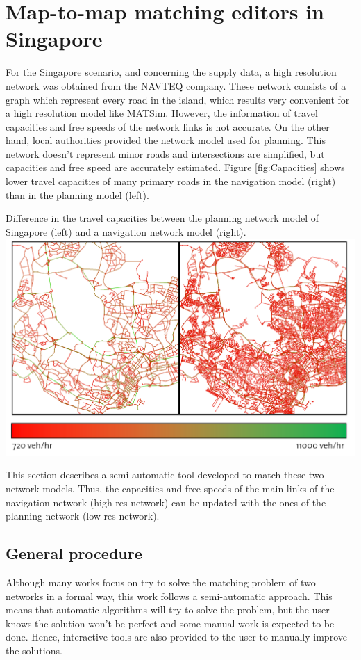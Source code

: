\section{Map-to-map matching editors in Singapore}
\citet[][]{Ordonez_Webpage_2011_3}
For the Singapore scenario, and concerning the supply data, a high resolution network was obtained from the NAVTEQ company. These network consists of a graph which represent every road in the island, which results very convenient for a high resolution model like MATSim. However, the information of travel capacities and free speeds of the network links is not accurate. On the other hand, local authorities provided the network model used for planning. This network doesn't represent minor roads and intersections are simplified, but capacities and free speed are accurately estimated. Figure \ref{fig:Capacities} shows lower travel capacities of many primary roads in the navigation model (right) than in the planning model (left).

\createfigure
{}
{Difference in the travel capacities between the planning network model of Singapore (left) and a navigation network model (right).}
{\label{fig:Capacities}}
{\includegraphics[width=1.0\textwidth]{extending/figures/netEdSing/Capacities.png}}
{}

This section describes a semi-automatic tool developed to match these two network models. Thus, the capacities and free speeds of the main links of the navigation network (high-res network) can be updated with the ones of the planning network (low-res network).

\subsection{General procedure}
Although many works focus on try to solve the matching problem of two networks in a formal way, this work follows a semi-automatic approach. This means that automatic algorithms will try to solve the problem, but the user knows the solution won't be perfect and some manual work is expected to be done. Hence, interactive tools are also provided to the user to manually improve the solutions.

